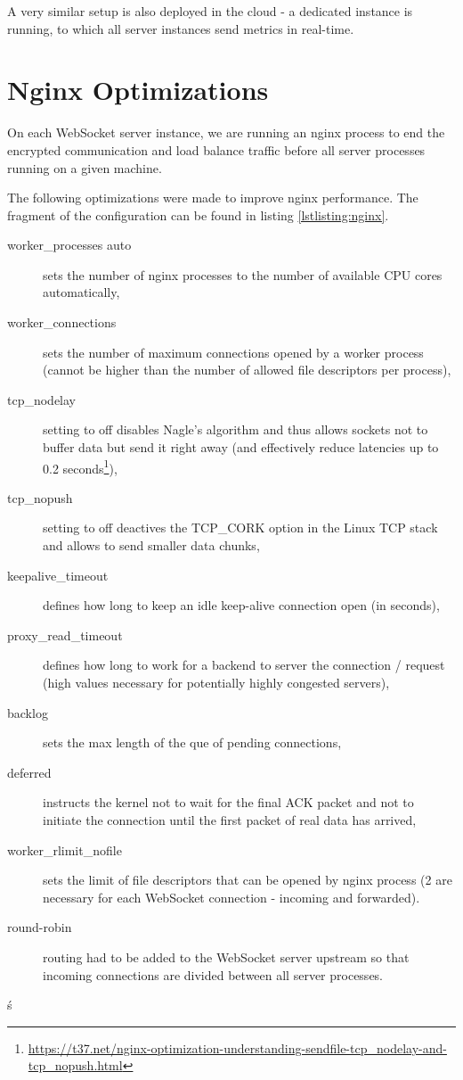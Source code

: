 \documentclass{uvamscse}
\begin{document}
A very similar setup is also deployed in the cloud - a dedicated instance is running, to which all server instances send metrics in real-time.

\section{Nginx Optimizations}
On each WebSocket server instance, we are running an nginx process to end the encrypted communication and load balance traffic before all server processes running on a given machine.

The following optimizations were made to improve nginx performance. The fragment of the configuration can be found in listing \ref{lstlisting:nginx}.

\begin{description}
  \item [worker\_processes auto] sets the number of nginx processes to the number of available CPU cores automatically,
  \item [worker\_connections] sets the number of maximum connections opened by a worker process (cannot be higher than the number of allowed file descriptors per process),
  \item [tcp\_nodelay] setting to off disables Nagle’s algorithm and thus allows sockets not to buffer data but send it right away (and effectively reduce latencies up to 0.2 seconds\footnote{\url{https://t37.net/nginx-optimization-understanding-sendfile-tcp\_nodelay-and-tcp_nopush.html}}),
  \item [tcp\_nopush] setting to off deactives the TCP\_CORK option in the Linux TCP stack and allows to send smaller data chunks,
  \item [keepalive\_timeout] defines how long to keep an idle keep-alive connection open (in seconds),
  \item [proxy\_read\_timeout] defines how long to work for a backend to server the connection / request (high values necessary for potentially highly congested servers),
  \item [backlog] sets the max length of the que of pending connections,
  \item [deferred] instructs the kernel not to wait for the final ACK packet and not to initiate the connection until the first packet of real data has arrived,
  \item [worker\_rlimit\_nofile] sets the limit of file descriptors that can be opened by nginx process (2 are necessary for each WebSocket connection - incoming and forwarded).
  \item [round-robin] routing had to be added to the WebSocket server upstream so that incoming connections are divided between all server processes.
\end{description}ś
\end{document}
